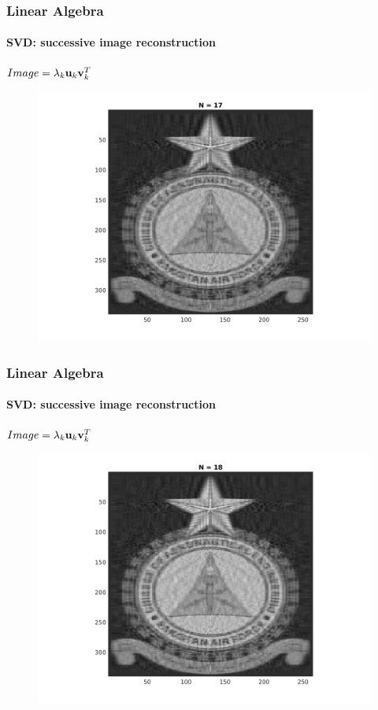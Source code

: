 \documentclass[hyperref={pdfpagelabels=true}]{beamer}
\begin{document}
\begin{frame}
\frametitle{Linear Algebra}
\framesubtitle{SVD: successive image reconstruction} 
\small{
\begin{center}
$Image = \lambda_k{\bf u}_k {\bf v}_k^T$
\end{center}}
\begin{figure}[!htb]
\centering
\includegraphics [scale=0.48]{n/b17.png}
\end{figure}
\end{frame}

\begin{frame}
\frametitle{Linear Algebra}
\framesubtitle{SVD: successive image reconstruction} 
\small{
\begin{center}
$Image = \lambda_k{\bf u}_k {\bf v}_k^T$
\end{center}}
\begin{figure}[!htb]
\centering
\includegraphics [scale=0.48]{n/b18.png}
\end{figure}
\end{frame}
\end{document}
